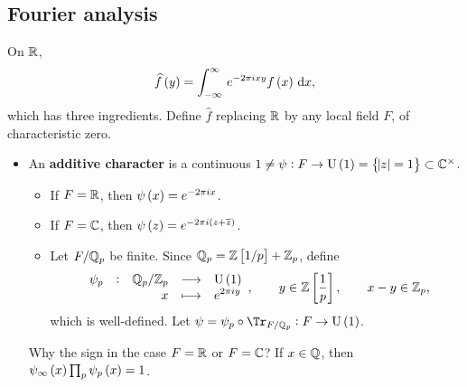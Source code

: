 \subsection{Fourier analysis}

On $ \mathbb{R} $,
$$ \widehat{f}\br{y} = \intd{-\infty}{\infty}{e^{-2\pi ixy}f\br{x}}{x}, $$
which has three ingredients. Define $ \widehat{f} $ replacing $ \mathbb{R} $ by any local field $ F $, of characteristic zero.
\begin{itemize}
\item An \textbf{additive character} is a continuous $ 1 \ne \psi : F \to \U\br{1} = \cbr{\abs{z} = 1} \subset \CC^\times $.
\begin{itemize}
\item If $ F = \mathbb{R} $, then $ \psi\br{x} = e^{-2\pi ix} $.
\item If $ F = \mathbb{C} $, then $ \psi\br{z} = e^{-2\pi i\br{z + \overline{z}}} $.
\item Let $ F / \mathbb{Q}_p $ be finite. Since $ \QQ_p = \ZZ\sbr{1 / p} + \ZZ_p $, define
$$ \function[\psi_p]{\QQ_p / \ZZ_p}{\U\br{1}}{x}{e^{2\pi iy}}, \qquad y \in \ZZ\sbr{\dfrac{1}{p}}, \qquad x - y \in \ZZ_p, $$
which is well-defined. Let $ \psi = \psi_p \circ \Tr_{F / \QQ_p} : F \to \U\br{1} $.
\end{itemize}
Why the sign in the case $ F = \mathbb{R} $ or $ F = \mathbb{C} $? If $ x \in \mathbb{Q} $, then $ \psi_\infty\br{x}\prod_p \psi_p\br{x} = 1 $.
\end{itemize}

